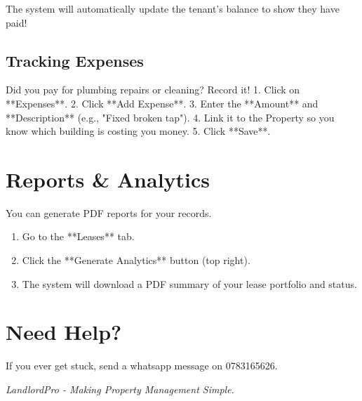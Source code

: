 \documentclass[12pt,a4paper]{article}
\begin{document}
The system will automatically update the tenant's balance to show they have paid!

\subsection{Tracking Expenses}
Did you pay for plumbing repairs or cleaning? Record it!
1. Click on **Expenses**.
2. Click **Add Expense**.
3. Enter the **Amount** and **Description** (e.g., "Fixed broken tap").
4. Link it to the Property so you know which building is costing you money.
5. Click **Save**.

\section{Reports \& Analytics}
You can generate PDF reports for your records.
\begin{enumerate}
    \item Go to the **Leases** tab.
    \item Click the **Generate Analytics** button (top right).
    \item The system will download a PDF summary of your lease portfolio and status.
\end{enumerate}

\section{Need Help?}
If you ever get stuck, send a whatsapp message on 0783165626.

\vspace{1cm}
\begin{center}
    \textcolor{brandGray}{\textit{LandlordPro - Making Property Management Simple.}}
\end{center}
\end{document}
